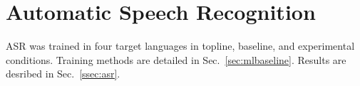 \section{Automatic Speech Recognition}
\label{sec:methods}

ASR was trained in four target languages in topline,
baseline, and experimental conditions. Training methods are detailed
in Sec.~\ref{sec:mlbaseline}.  Results are desribed in
Sec.~\ref{ssec:asr}.

